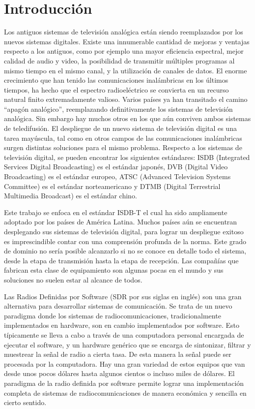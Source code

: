 \documentclass[journal,comsoc]{IEEEtran}
\begin{document}
\IEEEpeerreviewmaketitle



\section{Introducción}
Los antiguos sistemas de televisión analógica están siendo reemplazados por los nuevos sistemas digitales. Existe una innumerable cantidad de mejoras y ventajas respecto a los antiguos, como por ejemplo una mayor eficiencia espectral, mejor calidad de audio y video, la posibilidad de transmitir múltiples programas al mismo tiempo en el mismo canal, y la utilización de canales de datos. El enorme crecimiento que han tenido las comunicaciones inalámbricas en los últimos tiempos, ha hecho que el espectro radioeléctrico se convierta en un recurso natural finito extremadamente valioso. Varios países ya han transitado el camino “apagón analógico”, reemplazando definitivamente los sistemas de televisión analógica. Sin embargo hay muchos otros en los que aún conviven ambos sistemas de teledifusión.
El despliegue de un nuevo sistema de televisión digital es una tarea mayúscula, tal como en otros campos de las comunicaciones inalámbricas surgen distintas soluciones para el mismo problema. Respecto a los sistemas de televisión digital, se pueden encontrar los siguientes estándares: ISDB (Integrated Services Digital Broadcasting) es el estándar japonés, DVB (Digital Video Broadcasting) es el estándar europeo, ATSC (Advanced Television Systems Committee) es el estándar norteamericano y DTMB (Digital Terrestrial Multimedia Broadcast) es el estándar chino.

Este trabajo se enfoca en el estándar ISDB-T el cual ha sido ampliamente adoptado por los países de América Latina. Muchos países aún se encuentran desplegando sus sistemas de televisión digital, para lograr un despliegue exitoso es imprescindible contar con una comprensión profunda de la norma. Este grado de dominio no sería posible alcanzarlo si no se conoce en detalle todo el sistema, desde la etapa de transmisión hasta la etapa de recepción. Las compañías que fabrican esta clase de equipamiento son algunas pocas en el mundo y sus soluciones no suelen estar al alcance de todos. 

Las Radios Definidas por Software (SDR por sus siglas en inglés) son una gran alternativa para desarrollar sistemas de comunicación. Se trata de un nuevo paradigma donde los sistemas de radiocomunicaciones, tradicionalmente implementados en hardware, son en cambio implementados por software. Esto típicamente se lleva a cabo a través de una computadora personal encargada de ejecutar el software, y un hardware genérico que se encarga de sintonizar, filtrar y muestrear la señal de radio a cierta tasa. De esta manera la señal puede ser procesada por la computadora. Hay una gran variedad de estos equipos que van desde unos pocos dólares hasta algunos cientos o incluso miles de dólares. El paradigma de la radio definida por software permite lograr una implementación completa de sistemas de radiocomunicaciones de manera económica y sencilla en cierto sentido. 
\end{document}
